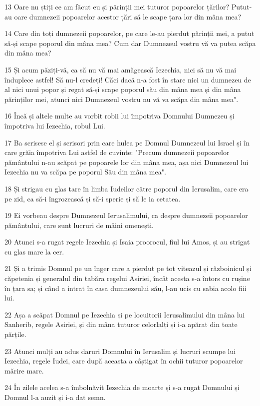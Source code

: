 \par 13 Oare nu știți ce am făcut eu și părinții mei tuturor popoarelor țărilor? Putut-au oare dumnezeii popoarelor acestor țări să le scape țara lor din mâna mea?
\par 14 Care din toți dumnezeii popoarelor, pe care le-au pierdut părinții mei, a putut să-și scape poporul din mâna mea? Cum dar Dumnezeul vostru vă va putea scăpa din mâna mea?
\par 15 Și acum păziți-vă, ca să nu vă mai amăgească Iezechia, nici să nu vă mai înduplece astfel! Să nu-l credeți! Căci dacă n-a fost în stare nici un dumnezeu de al nici unui popor și regat să-și scape poporul său din mâna mea și din mâna părinților mei, atunci nici Dumnezeul vostru nu vă va scăpa din mâna mea".
\par 16 Încă și altele multe au vorbit robii lui împotriva Domnului Dumnezeu și împotriva lui Iezechia, robul Lui.
\par 17 Ba scrisese el și scrisori prin care hulea pe Domnul Dumnezeul lui Israel și în care grăia împotriva Lui astfel de cuvinte: "Precum dumnezeii popoarelor pământului n-au scăpat pe popoarele lor din mâna mea, așa nici Dumnezeul lui Iezechia nu va scăpa pe poporul Său din mâna mea".
\par 18 Și strigau cu glas tare în limba Iudeilor către poporul din Ierusalim, care era pe zid, ca să-i îngrozească și să-i sperie și să le ia cetatea.
\par 19 Ei vorbeau despre Dumnezeul Ierusalimului, ca despre dumnezeii popoarelor pământului, care sunt lucruri de mâini omenești.
\par 20 Atunci s-a rugat regele Iezechia și Isaia proorocul, fiul lui Amos, și au strigat cu glas mare la cer.
\par 21 Și a trimis Domnul pe un înger care a pierdut pe tot viteazul și războinicul și căpetenia și generalul din tabăra regelui Asiriei, încât acesta s-a întors cu rușine în țara sa; și când a intrat în casa dumnezeului său, l-au ucis cu sabia acolo fiii lui.
\par 22 Așa a scăpat Domnul pe Iezechia și pe locuitorii Ierusalimului din mâna lui Sanherib, regele Asiriei, și din mâna tuturor celorlalți și i-a apărat din toate părțile.
\par 23 Atunci mulți au adus daruri Domnului în Ierusalim și lucruri scumpe lui Iezechia, regele Iudei, care după aceasta a câștigat în ochii tuturor popoarelor mărire mare.
\par 24 În zilele acelea s-a îmbolnăvit Iezechia de moarte și s-a rugat Domnului și Domnul l-a auzit și i-a dat semn.
